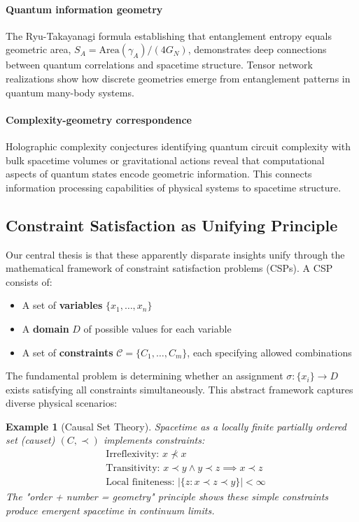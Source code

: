 \documentclass[11pt,a4paper]{article}
\newtheorem{example}{Example}[section]
\theoremstyle{remark}
\theoremstyle{definition}
\begin{document}
\paragraph{Quantum information geometry} The Ryu-Takayanagi formula \cite{Ryu2006} establishing that entanglement entropy equals geometric area, $S_A = \text{Area}(\gamma_A)/(4G_N)$, demonstrates deep connections between quantum correlations and spacetime structure. Tensor network realizations \cite{Swingle2012,Pastawski2015} show how discrete geometries emerge from entanglement patterns in quantum many-body systems.

\paragraph{Complexity-geometry correspondence} Holographic complexity conjectures \cite{Susskind2014,Brown2016} identifying quantum circuit complexity with bulk spacetime volumes or gravitational actions reveal that computational aspects of quantum states encode geometric information. This connects information processing capabilities of physical systems to spacetime structure.

\subsection{Constraint Satisfaction as Unifying Principle}

Our central thesis is that these apparently disparate insights unify through the mathematical framework of constraint satisfaction problems (CSPs). A CSP consists of:
\begin{itemize}
\item A set of \textbf{variables} $\{x_1, \ldots, x_n\}$
\item A \textbf{domain} $D$ of possible values for each variable
\item A set of \textbf{constraints} $\mathcal{C} = \{C_1, \ldots, C_m\}$, each specifying allowed combinations
\end{itemize}

The fundamental problem is determining whether an assignment $\sigma: \{x_i\} \to D$ exists satisfying all constraints simultaneously. This abstract framework captures diverse physical scenarios:

\begin{example}[Causal Set Theory]
Spacetime as a locally finite partially ordered set (causet) $(C, \prec)$ implements constraints:
\begin{align}
&\text{Irreflexivity: } x \not\prec x \\
&\text{Transitivity: } x \prec y \wedge y \prec z \implies x \prec z \\
&\text{Local finiteness: } |\{z : x \prec z \prec y\}| < \infty
\end{align}
The "order + number = geometry" principle shows these simple constraints produce emergent spacetime in continuum limits.
\end{example}
\end{document}
